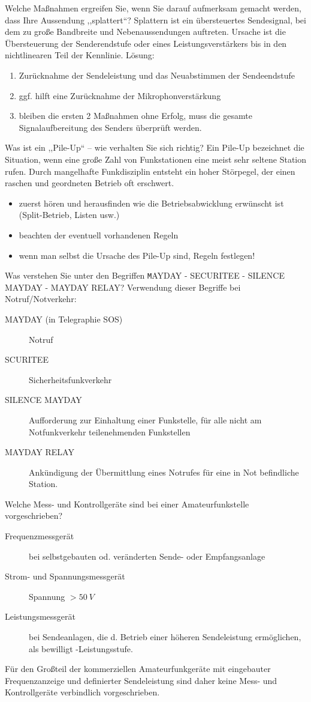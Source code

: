 \documentclass[avery5371,grid,frame,a4paper]{flashcards}
\newcommand{\card}[3]{
  \begin{flashcard}[{\chap} -- #1]{#2}#3\end{flashcard}
}
\begin{document}
\card{45}{Welche Maßnahmen ergreifen Sie, wenn Sie darauf aufmerksam gemacht werden, dass Ihre Aussendung ,,splattert``?}{
  \footnotesize
  Splattern ist ein übersteuertes Sendesignal, bei dem zu große Bandbreite und Nebenaussendungen auftreten. Ursache ist die Übersteuerung der Senderendstufe oder eines Leistungsverstärkers bis in den  nichtlinearen Teil der Kennlinie. Lösung:
  \begin{enumerate}
    \item Zurücknahme der Sendeleistung und das Neuabstimmen der Sendeendstufe
    \item ggf. hilft eine Zurücknahme der Mikrophonverstärkung
    \item bleiben die ersten 2 Maßnahmen ohne Erfolg, muss die gesamte Signalaufbereitung des Senders überprüft werden.
  \end{enumerate}
}
\card{46}{Was ist ein ,,Pile-Up`` -- wie verhalten Sie sich richtig?}{
  \small
  Ein Pile-Up bezeichnet die Situation, wenn eine große Zahl von Funkstationen eine meist sehr seltene Station rufen. Durch mangelhafte Funkdisziplin entsteht ein hoher Störpegel, der einen raschen und geordneten Betrieb oft erschwert.
  \begin{itemize}
    \item zuerst hören und herausfinden wie die Betriebsabwicklung erwünscht ist (Split-Betrieb, Listen usw.)
    \item beachten der eventuell vorhandenen Regeln
    \item wenn man selbst die Ursache des Pile-Up  sind, Regeln festlegen!
  \end{itemize}
}
\card{47}{Was verstehen Sie unter den Begriffen {\footnotesize\texttt MAYDAY - SECURITEE - SILENCE MAYDAY - MAYDAY RELAY?}}{
  \small
  Verwendung dieser Begriffe bei Notruf/Notverkehr:
  \begin{description}
    \item[MAYDAY (in Telegraphie SOS)] Notruf
    \item[SCURITEE] Sicherheitsfunkverkehr
    \item[SILENCE MAYDAY] Aufforderung zur Einhaltung einer Funkstelle, für alle nicht am Notfunkverkehr teilenehmenden Funkstellen
    \item[MAYDAY RELAY] Ankündigung der Übermittlung eines Notrufes für eine in Not befindliche Station.
  \end{description}
}
\card{48}{Welche Mess- und Kontrollgeräte sind bei einer Amateurfunkstelle vorgeschrieben?}{
  \small
  \begin{description}
    \item[Frequenzmessgerät] bei selbstgebauten od. veränderten Sende- oder Empfangsanlage
    \item[Strom- und Spannungsmessgerät] Spannung $>50~V$
    \item[Leistungsmessgerät] bei Sendeanlagen, die d. Betrieb einer höheren Sendeleistung ermöglichen, als bewilligt -Leistungsstufe.
  \end{description}
  Für den Großteil der kommerziellen Amateurfunkgeräte mit eingebauter Frequenzanzeige und definierter Sendeleistung sind daher keine Mess- und Kontrollgeräte verbindlich vorgeschrieben.
}
\end{document}
